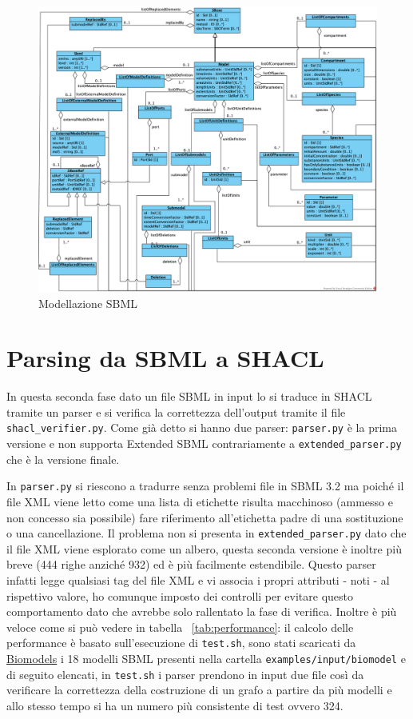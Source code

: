 \documentclass{article}
\begin{document}
\begin{figure}
    \caption{Modellazione SBML}
    \label{fig:diagram}
    \includegraphics[scale=0.6]{images/diagram.png}
\end{figure}
\clearpage

\section{Parsing da SBML a SHACL}

In questa seconda fase dato un file SBML in input lo si traduce in SHACL tramite un parser e si verifica la correttezza dell'output tramite il file \texttt{shacl\_verifier.py}. Come già detto si hanno due parser: \texttt{parser.py} è la prima versione e non supporta Extended SBML contrariamente a \texttt{extended\_parser.py} che è la versione finale. 

In \texttt{parser.py} si riescono a tradurre senza problemi file in SBML 3.2 ma poiché il file XML viene letto come una lista di etichette risulta macchinoso (ammesso e non concesso sia possibile) fare riferimento all'etichetta padre di una sostituzione o una cancellazione. Il problema non si presenta in \texttt{extended\_parser.py} dato che il file XML viene esplorato come un albero, questa seconda versione è inoltre più breve (444 righe anziché 932) ed è più facilmente estendibile. Questo parser infatti legge qualsiasi tag del file XML e vi associa i propri attributi - noti - al rispettivo valore, ho comunque imposto dei controlli per evitare questo comportamento dato che avrebbe solo rallentato la fase di verifica. Inoltre è più veloce come si può vedere in tabella ~\ref{tab:performance}: il calcolo delle performance è basato sull'esecuzione di \texttt{test.sh}, sono stati scaricati da \href{https://www.ebi.ac.uk/biomodels/}{Biomodels} i 18 modelli SBML presenti nella cartella \texttt{examples/input/biomodel} e di seguito elencati, in \texttt{test.sh} i parser prendono in input due file così da verificare la correttezza della costruzione di un grafo a partire da più modelli e allo stesso tempo si ha un numero più consistente di test ovvero 324. 
\end{document}
